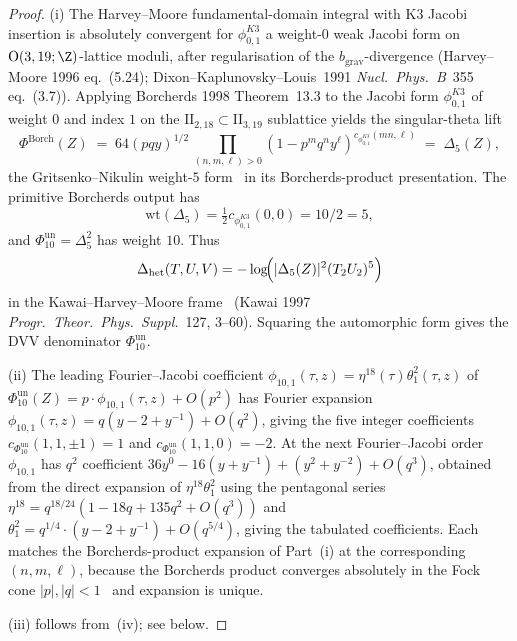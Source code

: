 \begin{proof}
\textup{(i)} The Harvey--Moore fundamental-domain integral with K3
Jacobi insertion is absolutely convergent for $\phi_{0,1}^{K3}$
a weight-$0$ weak Jacobi form on $\mathrm{O}(3,19;\Z)$-lattice moduli,
after regularisation of the $b_{\mathrm{grav}}$-divergence (Harvey--Moore
1996 eq.~(5.24); Dixon--Kaplunovsky--Louis~1991
\emph{Nucl.~Phys.~B}~355 eq.~(3.7)). Applying Borcherds 1998
Theorem~13.3 to the Jacobi form
$\phi_{0,1}^{K3}$ of weight $0$ and index $1$ on the
$\mathrm{II}_{2,18}\subset\mathrm{II}_{3,19}$ sublattice yields the
singular-theta lift
\[
\Phi^{\mathrm{Borch}}(Z)
\;=\;
64(p q y)^{1/2}\,
\prod_{(n, m, \ell) > 0}
(1 - p^m q^n y^\ell)^{c_{\phi_{0,1}^{K3}}(mn,\ell)}
\;=\;
\Delta_5(Z),
\]
the Gritsenko--Nikulin weight-$5$ form~\cite[Theorem~2.1]{GritsenkoNikulin1998}
in its Borcherds-product presentation. The primitive Borcherds output has
\[
\mathrm{wt}(\Delta_5)=\tfrac12c_{\phi_{0,1}^{K3}}(0,0)=10/2=5,
\]
and \(\Phi_{10}^{\mathrm{un}}=\Delta_5^2\) has weight \(10\). Thus
\[
\Delta_{\mathrm{het}}(T, U, V)
= -\log\!\Bigl(|\Delta_5(Z)|^2(T_2 U_2)^5\Bigr)
\]
in the Kawai--Harvey--Moore
frame~\cite{HarveyMoore1996} (Kawai 1997
\emph{Progr.\ Theor.\ Phys.\ Suppl.}~127, 3--60). Squaring the
automorphic form gives the DVV denominator \(\Phi_{10}^{\mathrm{un}}\).

\textup{(ii)} The leading Fourier--Jacobi coefficient
$\phi_{10,1}(\tau, z) = \eta^{18}(\tau)\theta_1^2(\tau, z)$ of
$\Phi_{10}^{\mathrm{un}}(Z) = p\cdot\phi_{10,1}(\tau, z) + O(p^2)$ has
Fourier expansion
\(\phi_{10,1}(\tau, z) = q(y - 2 + y^{-1}) + O(q^2)\),
giving the five integer coefficients
$c_{\Phi_{10}^{\mathrm{un}}}(1, 1, \pm 1) = 1$
and $c_{\Phi_{10}^{\mathrm{un}}}(1, 1, 0) = -2$. At the next Fourier--Jacobi order
$\phi_{10,1}$ has $q^2$ coefficient
$36 y^0 - 16(y + y^{-1}) + (y^2 + y^{-2}) + O(q^3)$, obtained from the
direct expansion of $\eta^{18}\theta_1^2$ using the pentagonal series
$\eta^{18} = q^{18/24}(1 - 18 q + 135 q^2 + O(q^3))$ and
$\theta_1^2 = q^{1/4}\cdot(y - 2 + y^{-1}) + O(q^{5/4})$, giving
the tabulated coefficients. Each matches the Borcherds-product
expansion of Part~\textup{(i)} at the corresponding $(n, m, \ell)$,
because the Borcherds product converges absolutely in the Fock cone
$|p|, |q| < 1$~\cite[\S 10]{Borcherds1998} and expansion is unique.

\textup{(iii)} follows from~\textup{(iv)}; see below.


\end{proof}
